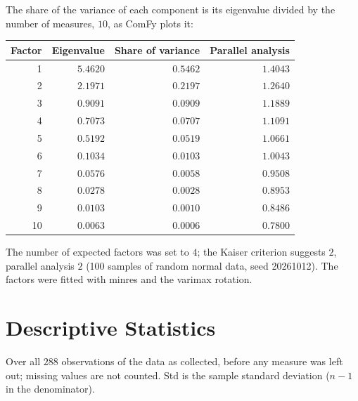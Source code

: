 \documentclass[a4paper]{article}
\begin{document}
\noindent
The share of the variance of each component is its eigenvalue divided by the number of measures, $10$, as ComFy plots it:
\begin{center}
\begin{tabular}{rrrr}
\toprule
Factor & Eigenvalue & Share of variance & Parallel analysis \\
\midrule
1 & $5.4620$ & $0.5462$ & $1.4043$ \\
2 & $2.1971$ & $0.2197$ & $1.2640$ \\
3 & $0.9091$ & $0.0909$ & $1.1889$ \\
4 & $0.7073$ & $0.0707$ & $1.1091$ \\
5 & $0.5192$ & $0.0519$ & $1.0661$ \\
6 & $0.1034$ & $0.0103$ & $1.0043$ \\
7 & $0.0576$ & $0.0058$ & $0.9508$ \\
8 & $0.0278$ & $0.0028$ & $0.8953$ \\
9 & $0.0103$ & $0.0010$ & $0.8486$ \\
10 & $0.0063$ & $0.0006$ & $0.7800$ \\
\bottomrule
\end{tabular}
\end{center}

The number of expected factors was set to $4$; the Kaiser criterion suggests $2$, parallel analysis $2$ (100 samples of random normal data, seed 20261012). The factors were fitted with minres and the varimax rotation.

\section*{Descriptive Statistics}
\noindent
Over all $288$ observations of the data as collected, before any measure was left out; missing values are not counted. Std is the sample standard deviation ($n - 1$ in the denominator).
\end{document}
